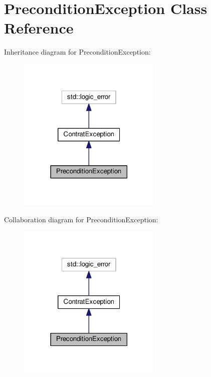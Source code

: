 \hypertarget{classPreconditionException}{}\section{Precondition\+Exception Class Reference}
\label{classPreconditionException}


Inheritance diagram for Precondition\+Exception\+:\nopagebreak
\begin{figure}[H]
\begin{center}
\leavevmode
\includegraphics[width=194pt]{classPreconditionException__inherit__graph}
\end{center}
\end{figure}


Collaboration diagram for Precondition\+Exception\+:\nopagebreak
\begin{figure}[H]
\begin{center}
\leavevmode
\includegraphics[width=194pt]{classPreconditionException__coll__graph}
\end{center}
\end{figure}
